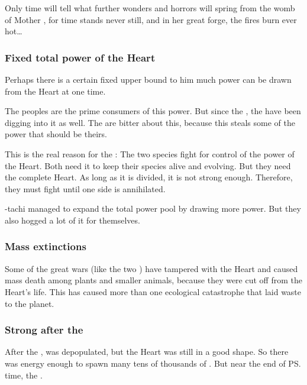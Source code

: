 Only time will tell what further wonders and horrors will spring from the womb of Mother \Miith{}, for time stands never still, and in her great forge, the fires burn ever hot\ldots{} 





\subsubsection{Fixed total power of the Heart}
Perhaps there is a certain fixed upper bound to him much power can be drawn from the Heart at one time. 

The \ophidian{} peoples are the prime consumers of this power. But since the , the \resphain{} have been digging into it as well. The \dragons{} are bitter about this, because this steals some of the power that should be theirs. 

This is the real reason for the : The two species fight for control of the power of the Heart. Both need it to keep their species alive and evolving. But they need the complete Heart. As long as it is divided, it is not strong enough. Therefore, they must fight until one side is annihilated. 

\Tiamat-tachi managed to expand the total power pool by drawing more \xsic{} power. But they also hogged a lot of it for themselves. 





\subsubsection{Mass extinctions}
Some of the great wars (like the two \Banewars) have tampered with the Heart and caused mass death among plants and smaller animals, because they were cut off from the Heart's life. 
This has caused more than one ecological catastrophe that laid waste to the planet. 





\subsubsection{Strong after the \firstbanewar}
After the \firstbanewar, \Miith{} was depopulated, but the Heart was still in a good shape. 
So there was energy enough to spawn many tens of thousands of \resphain. 
But near the end of \ps{} time, the . 





